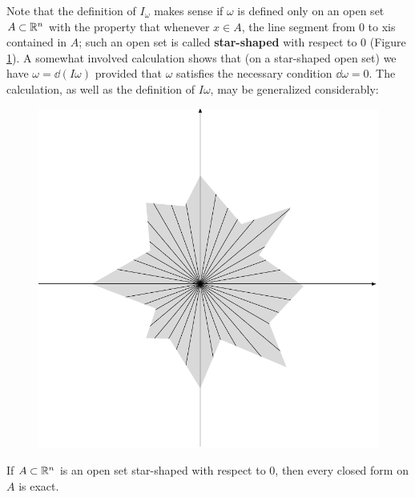 Note that the definition of $I_\omega$ makes sense if $\omega$ is defined only
on an open set $A\subset \mathbb{R}^n$ with the property that whenever
$x\in A$, the line segment from 0 to xis contained in $A$; such
an open set is called \textbf{star-shaped} with respect to 0 (Figure \ref{Fig 4-3}).
A somewhat involved calculation shows that (on a star-shaped open set) 
we have $\omega = \dd(I\omega)$ provided that $\omega$ satisfies the 
necessary condition $\dd\omega = 0$. The calculation, as well
as the definition of $I\omega$, may be generalized considerably:

\begin{figure}[!htb]
  \centering
  \includegraphics[width=.75\linewidth]{./pics/Fig4-3.pdf}
  \caption{}
  \label{Fig 4-3}
\end{figure}

\begin{theorem}
  If $A\subset \mathbb{R}^n$ is an open set star-shaped with respect to 0, 
  then every closed form on $A$ is exact.
\end{theorem}

